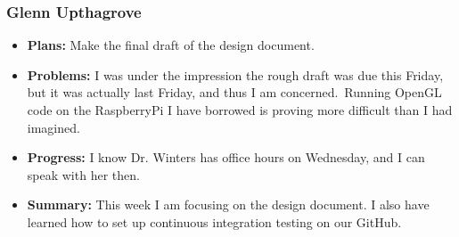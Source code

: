 \documentclass[onecolumn, draftclsnofoot,10pt, compsoc]{IEEEtran}
\begin{document}
\subsubsection{Glenn Upthagrove}
\begin {itemize}
 \item \textbf{Plans: }Make the final draft of the design document. 
 \item \textbf{Problems: }I was under the impression the rough draft was due this Friday, but it was actually last Friday, and thus I am concerned. Running OpenGL code on the RaspberryPi I have borrowed is proving more difficult than I had imagined.
 \item \textbf{Progress: }I know Dr. Winters has office hours on Wednesday, and I can speak with her then.
 \item \textbf{Summary: }This week I am focusing on the design document. I also have learned how to set up continuous integration testing on our GitHub.
\end {itemize}


%
%
\end{document}
